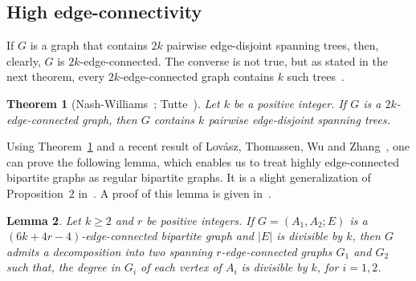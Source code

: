 \documentclass[12pt,reqno,a4paper]{amsart}
\newtheorem{theorem}{Theorem}[section]
\newtheorem{lemma}[theorem]{Lemma}
\begin{document}
\subsection{High edge-connectivity}

If \(G\)
is a graph that contains \(2k\)
pairwise edge-disjoint spanning trees, then, clearly, \(G\)
is \hbox{\(2k\)-edge-connected.}
The converse is not true, but as stated in the next theorem,  every
  \(2k\)-edge-connected graph contains \(k\)
  such trees~\cite{Na61,Tu61}. 

 \begin{theorem}[Nash-Williams~\cite{Na61}; Tutte~\cite{Tu61}]
 \label{thm:edge-disjoint-spanning-trees}
 	Let \(k\) be a positive integer. 
 	If \(G\) is a \(2k\)-edge-connected graph, 
 	then \(G\) contains \(k\) pairwise edge-disjoint spanning trees.
 \end{theorem}


  Using Theorem~\ref{thm:edge-disjoint-spanning-trees} and a recent
  result of Lov{\'a}sz, Thomassen, Wu and Zhang~\cite{LoThWuZh13}, one
  can prove the following lemma, which enables us to treat highly
  edge-connected bipartite graphs as regular bipartite graphs. It is a
  slight generalization of Proposition~\(2\)
  in~\cite{Th13a}. A proof of this lemma is given
  in~\cite{BoMoOsWa14+}.




\begin{lemma}
\label{lem:tight-good-initial-decomposition}
	Let \(k\geq 2\) and \(r\) be positive integers.
	If \(G=(A_1, A_2;E)\) is a \((6k + 4r-4)\)-edge-connected bipartite 
	graph and \(|E|\) is divisible by 
	\(k\), 
	then \(G\) admits a decomposition into two spanning 
	\(r\)-edge-connected graphs \(G_1\) and \(G_2\) such 
	that,
	the degree in \(G_i\) of each vertex of \(A_i\) is divisible by \(k\),
	for $i=1,2$.
\end{lemma}

\end{document}
